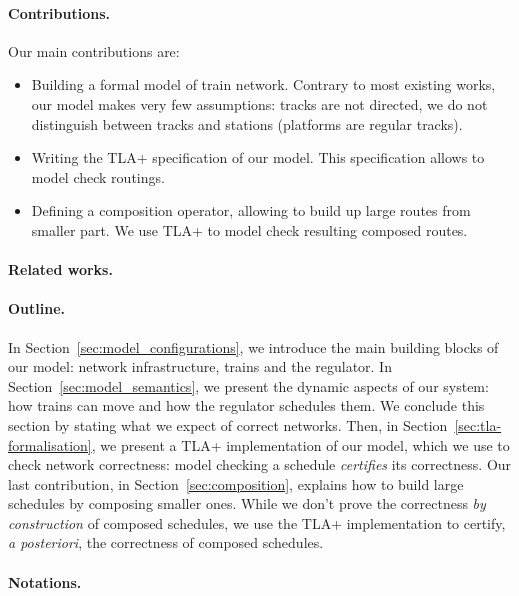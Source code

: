 \documentclass[runningheads]{llncs}
\begin{document}
\paragraph{Contributions.}
Our main contributions are:
\begin{itemize}
	\item Building a formal model of train network. Contrary to most existing works, our model makes very few assumptions: tracks are not directed, we do not distinguish between tracks and stations (platforms are regular tracks).
	\item Writing the TLA+ specification of our model. This specification allows to model check routings.
	\item Defining a composition operator, allowing to build up large routes from smaller part. We use TLA+ to model check resulting composed routes.
\end{itemize}

\paragraph{Related works.}


\paragraph{Outline.}
In Section~\ref{sec:model_configurations}, we introduce the main building blocks of our model: network infrastructure, trains and the regulator. In Section~\ref{sec:model_semantics}, we present the dynamic aspects of our system: how trains can move and how the regulator schedules them. We conclude this section by stating what we expect of correct networks. Then, in Section~\ref{sec:tla-formalisation}, we present a TLA+ implementation of our model, which we use to check network correctness: model checking a schedule \emph{certifies} its correctness. Our last contribution, in Section~\ref{sec:composition}, explains how to build large schedules by composing smaller ones. While we don't prove the correctness \emph{by construction} of composed schedules, we use the TLA+ implementation to certify, \emph{a posteriori}, the correctness of composed schedules.



\paragraph{Notations.}
\end{document}
